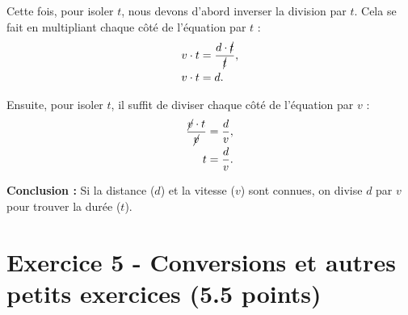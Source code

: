 \documentclass[answers]{exam}
\begin{document}
\begin{questions}
\begin{solution}
    Cette fois, pour isoler $t$, nous devons d'abord inverser la division par $t$. Cela se fait en multipliant chaque côté de l'équation par $t$ :
    \begin{align}
    v \cdot t &= \frac{d \cdot \cancel{t}}{\cancel{t}}, \\
    v \cdot t &= d.
    \end{align}

    Ensuite, pour isoler $t$, il suffit de diviser chaque côté de l'équation par $v$ :
    \begin{align}
    \frac{\cancel{v} \cdot t}{\cancel{v}} &= \frac{d}{v}, \\
    t &= \frac{d}{v}.
    \end{align}

    \textbf{Conclusion :} Si la distance ($d$) et la vitesse ($v$) sont connues, on divise $d$ par $v$ pour trouver la durée ($t$).
  \end{solution}
\end{questions}

\section*{Exercice 5 - Conversions et autres petits exercices (5.5 points)}
\end{document}
